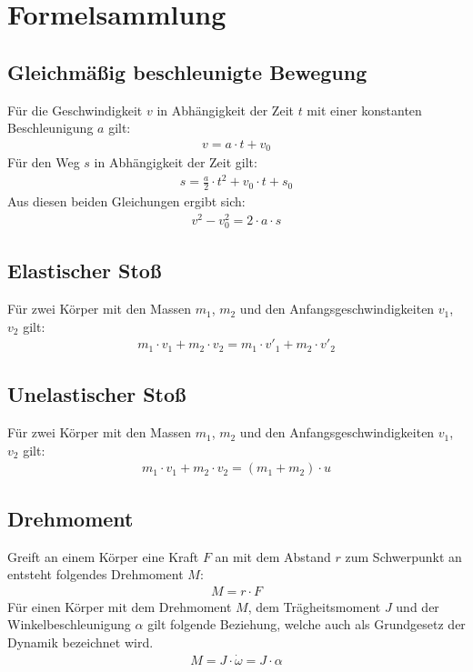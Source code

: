 \section{Formelsammlung}
\subsection*{Gleichmäßig beschleunigte Bewegung}
Für die Geschwindigkeit $v$ in Abhängigkeit der Zeit $t$ mit einer konstanten Beschleunigung $a$ gilt:
\begin{align*}
    v=a\cdot t+v_0
\end{align*}
Für den Weg $s$ in Abhängigkeit der Zeit gilt:
\begin{align*}
    s=\frac{a}{2}\cdot t^2+v_0\cdot t+s_0
\end{align*}
Aus diesen beiden Gleichungen ergibt sich:
\begin{align*}
    v^2-v_0^2=2\cdot a\cdot s
\end{align*}
\subsection*{Elastischer Stoß}
Für zwei Körper mit den Massen $m_1$, $m_2$ und den Anfangsgeschwindigkeiten $v_1$, $v_2$ gilt:
\begin{align*}
    m_1\cdot v_1+m_2\cdot v_2=m_1\cdot v'_1+m_2\cdot v'_2
\end{align*}
\subsection*{Unelastischer Stoß}
Für zwei Körper mit den Massen $m_1$, $m_2$ und den Anfangsgeschwindigkeiten $v_1$, $v_2$ gilt:
\begin{align*}
    m_1\cdot v_1+m_2\cdot v_2=(m_1+m_2)\cdot u
\end{align*}
\subsection*{Drehmoment}
Greift an einem Körper eine Kraft $F$ an mit dem Abstand $r$ zum Schwerpunkt an entsteht folgendes Drehmoment $M$:
\begin{align*}
    M=r\cdot F
\end{align*}
Für einen Körper mit dem Drehmoment $M$, dem Trägheitsmoment $J$ und der Winkelbeschleunigung $\alpha$ gilt folgende Beziehung, welche auch als Grundgesetz der Dynamik bezeichnet wird.
\begin{align*}
    M=J\cdot \dot{\omega}=J\cdot \alpha
\end{align*}
